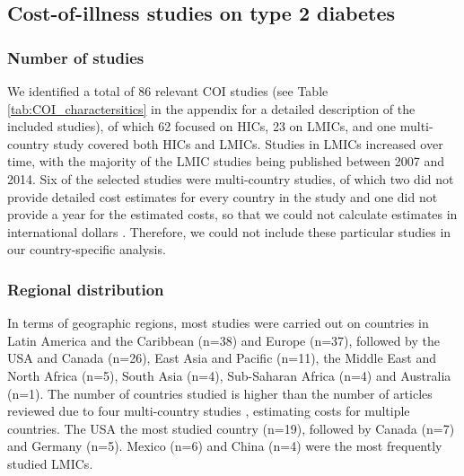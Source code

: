 \subsection{Cost-of-illness studies on type 2 diabetes}

\subsubsection{Number of studies}
We identified a total of 86 relevant \ac{COI} studies (see Table \ref{tab:COI_charactersitics} in the appendix for a detailed description of the included studies), of which 62 focused on \acp{HIC}, 23 on \acp{LMIC}, and one multi-country study covered both \acp{HIC} and \acp{LMIC}. Studies in \acp{LMIC} increased over time, with the majority of the \ac{LMIC} studies being published between 2007 and 2014. Six of the selected studies were multi-country studies, of which two \parencite{Kirigia2009,Smith-Spangler2012} did not provide detailed cost estimates for every country in the study and one did not provide a year for the estimated costs, so that we could not calculate estimates in international dollars \parencite{Boutayeb2014}. Therefore, we could not include these particular studies in our country-specific analysis.

\subsubsection{Regional distribution}
In terms of geographic regions, most studies were carried out on countries in Latin America and the Caribbean (n=38) and Europe (n=37), followed by the USA and Canada (n=26), East Asia and Pacific (n=11), the Middle East and North Africa (n=5), South Asia (n=4), Sub-Saharan Africa (n=4) and Australia (n=1). The number of countries studied is higher than the number of articles reviewed due to four multi-country studies \parencite{Boutayeb2014,Barcelo2003,Jonsson2002b,Abdulkadri2009b}, estimating costs for multiple countries. The USA \DIFdelbegin {}\DIFdelend \DIFaddbegin {}\DIFaddend the most studied country (n=19), followed by Canada (n=7) and Germany (n=5). Mexico (n=6) and China (n=4) were the most frequently studied \acp{LMIC}.

